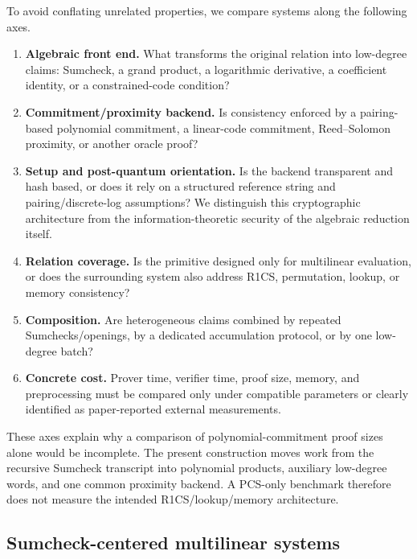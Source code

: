 To avoid conflating unrelated properties, we compare systems along the following axes.

\begin{enumerate}[label=(\roman*),leftmargin=*]
  \item \textbf{Algebraic front end.}  What transforms the original relation into low-degree claims: Sumcheck, a grand product, a logarithmic derivative, a coefficient identity, or a constrained-code condition?
  \item \textbf{Commitment/proximity backend.}  Is consistency enforced by a pairing-based polynomial commitment, a linear-code commitment, Reed--Solomon proximity, or another oracle proof?
  \item \textbf{Setup and post-quantum orientation.}  Is the backend transparent and hash based, or does it rely on a structured reference string and pairing/discrete-log assumptions?  We distinguish this cryptographic architecture from the information-theoretic security of the algebraic reduction itself.
  \item \textbf{Relation coverage.}  Is the primitive designed only for multilinear evaluation, or does the surrounding system also address R1CS, permutation, lookup, or memory consistency?
  \item \textbf{Composition.}  Are heterogeneous claims combined by repeated Sumchecks/openings, by a dedicated accumulation protocol, or by one low-degree batch?
  \item \textbf{Concrete cost.}  Prover time, verifier time, proof size, memory, and preprocessing must be compared only under compatible parameters or clearly identified as paper-reported external measurements.
\end{enumerate}

These axes explain why a comparison of polynomial-commitment proof sizes alone would be incomplete.  The present construction moves work from the recursive Sumcheck transcript into polynomial products, auxiliary low-degree words, and one common proximity backend.  A PCS-only benchmark therefore does not measure the intended R1CS/lookup/memory architecture.

\subsection{Sumcheck-centered multilinear systems}
\label{sec:comparison-sumcheck-systems}

